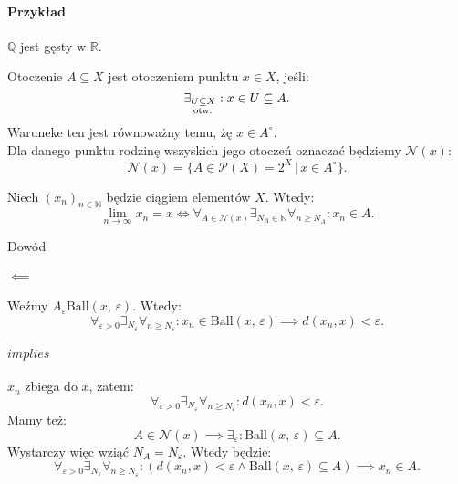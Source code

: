 \documentclass{article}
\numberwithin{defi}{section}
\numberwithin{defi}{section}
\newcommand{\R}{\mathbb{R}}
\newcommand{\N}{\mathbb{N}}
\newcommand{\Q}{\mathbb{Q}}
\newcommand{\oo}{\infty}
\newcommand{\Nau}{\mathcal{N}}
\newcommand{\subotw}{\underset{\clap{\scriptsize otw.}}{\subseteq}}
\newcommand{\dg}{^{\circ}}
\providecommand{\eps}{\varepsilon}
\providecommand{\dg}{^\circ}
\newcommand{\ciag}[1]{(#1_{n})_{n \in \N}}
\newcommand{\ball}[2]{\text{Ball}(#1, \, #2)}
\begin{document}
\paragraph*{Przykład} $\Q$ jest gęsty w $\R$.

\begin{defr}{Otoczenie}
    $A \subseteq X$ jest otoczeniem punktu $x \in X$, jeśli: \begin{equation}
        \exists_{U \subotw X}: x \in U \subseteq A.
    \end{equation} Waruneke ten jest równoważny temu, żę $x \in A \dg$. \\
    Dla danego punktu rodzinę wszyskich jego otoczeń oznaczać będziemy $\Nau (x)$: \begin{equation}
        \Nau (x) = \{ A \in \mathcal{P}(X) = 2^X \, \big| \, x \in A\dg \}.
    \end{equation}
\end{defr}

\begin{twier}{}
    Niech $\ciag{x}$ będzie ciągiem elementów $X$. Wtedy:\begin{equation}
        \lim_{n \to \oo} x_n = x \iff \forall_{A \in \Nau(x)} \exists_{N_A \in \N} \forall_{n \geqslant N_A}: x_n \in A.
    \end{equation}
\end{twier}

\begin{dow}{Dowód}
    \paragraph{$\impliedby$} Weźmy $A_\eps  \ball{x}{\eps}$. Wtedy:\begin{equation}
        \forall_{\eps >0} \exists_{N_\eps} \forall_{n \geqslant N_\eps}: x_n \in \ball{x}{\eps} \implies d(x_n, x) < \eps.
    \end{equation}
    \paragraph{$implies$} $x_n$ zbiega do $x$, zatem: \begin{equation*}
        \forall_{\eps >0} \exists_{N_\eps} \forall_{n \geqslant N_\eps}: d(x_n, x) < \eps.
    \end{equation*} Mamy też: \begin{equation*}
        A \in \Nau(x) \implies \exists_\eps: \ball{x}{\eps} \subseteq A.
    \end{equation*} Wystarczy więc wziąć $N_A = N_\eps$. Wtedy będzie: \begin{equation}
        \forall_{\eps >0} \exists_{N_\eps} \forall_{n \geqslant N_\eps}: (d(x_n, x) < \eps \wedge \ball{x}{\eps} \subseteq A) \implies x_n \in A.
    \end{equation}
\end{dow}
\end{document}
